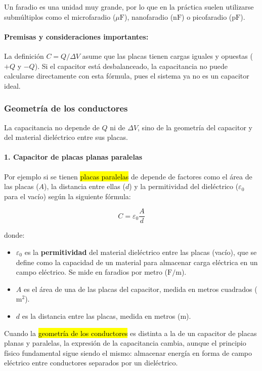 Un faradio es una unidad muy grande, por lo que en la práctica suelen utilizarse submúltiplos como el microfaradio (\(\mu\si{\farad}\)), nanofaradio (n\(\si{\farad}\)) o picofaradio (p\(\si{\farad}\)).

\paragraph{Premisas y consideraciones importantes:}

La definición \( C = Q/\Delta V \) asume que las placas tienen cargas iguales y opuestas (\( +Q \) y \( -Q \)). Si el capacitor está desbalanceado, la capacitancia no puede calcularse directamente con esta fórmula, pues el sistema ya no es un capacitor ideal.

\subsubsection{Geometría de los conductores}

La capacitancia no depende de \(Q\) ni de \(\Delta V\), sino de la geometría del capacitor y del material dieléctrico entre sus placas.

\paragraph{1. Capacitor de placas planas paralelas}

Por ejemplo si se tienen \hl{placas paralelas} de depende de factores como el área de las placas (\(A\)), la distancia entre ellas (\(d\)) y la permitividad del dieléctrico (\( \varepsilon_0 \) para el vacío) según la siguiente fórmula:

\[
C = \varepsilon_0 \frac{A}{d}
\]

donde:
\begin{itemize}
    \item \( \varepsilon_0 \) es la \textbf{permitividad} del material dieléctrico entre las placas (vacío), que se define como la capacidad de un material para almacenar carga eléctrica en un campo eléctrico. Se mide en faradios por metro (\(\si{\farad\per\meter}\)).
    \item \( A \) es el área de una de las placas del capacitor, medida en metros cuadrados (\(\si{\meter\squared}\)).
    \item \( d \) es la distancia entre las placas, medida en metros (\(\si{\meter}\)).
\end{itemize}

Cuando la \hl{geometría de los conductores} es distinta a la de un capacitor de placas planas y paralelas, la expresión de la capacitancia cambia, aunque el principio físico fundamental sigue siendo el mismo: almacenar energía en forma de campo eléctrico entre conductores separados por un dieléctrico.

